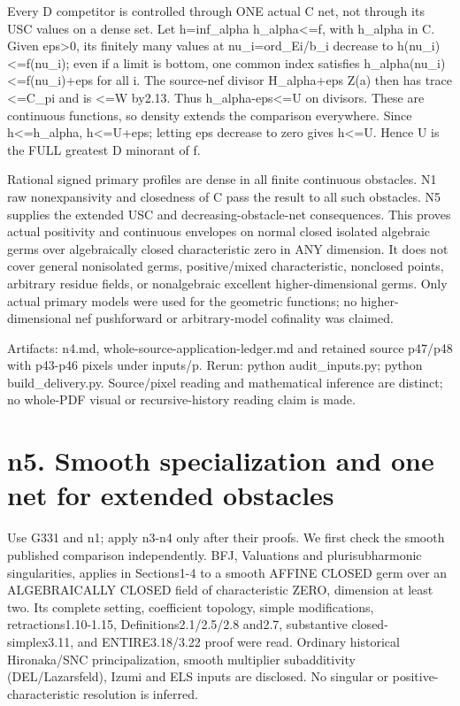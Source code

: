 \documentclass[11pt]{article}
\begin{document}
Every D competitor is controlled through ONE actual C net, not through its USC values on a dense set. Let h=inf\_alpha h\_alpha<=f, with h\_alpha in C. Given eps>0, its finitely many values at nu\_i=ord\_Ei/b\_i decrease to h(nu\_i)<=f(nu\_i); even if a limit is bottom, one common index satisfies h\_alpha(nu\_i)<=f(nu\_i)+eps for all i. The source-nef divisor H\_alpha+eps Z(a) then has trace <=C\_pi and is <=W by2.13. Thus h\_alpha-eps<=U on divisors. These are continuous functions, so density extends the comparison everywhere. Since h<=h\_alpha, h<=U+eps; letting eps decrease to zero gives h<=U. Hence U is the FULL greatest D minorant of f.

Rational signed primary profiles are dense in all finite continuous obstacles. N1 raw nonexpansivity and closedness of C pass the result to all such obstacles. N5 supplies the extended USC and decreasing-obstacle-net consequences. This proves actual positivity and continuous envelopes on normal closed isolated algebraic germs over algebraically closed characteristic zero in ANY dimension. It does not cover general nonisolated germs, positive/mixed characteristic, nonclosed points, arbitrary residue fields, or nonalgebraic excellent higher-dimensional germs. Only actual primary models were used for the geometric functions; no higher-dimensional nef pushforward or arbitrary-model cofinality was claimed.

Artifacts: n4.md, whole-source-application-ledger.md and retained source p47/p48 with p43-p46 pixels under inputs/p. Rerun: python audit\_inputs.py; python build\_delivery.py. Source/pixel reading and mathematical inference are distinct; no whole-PDF visual or recursive-history reading claim is made.


\section*{n5. Smooth specialization and one net for extended obstacles}

Use G331 and n1; apply n3-n4 only after their proofs. We first check the smooth published comparison independently. BFJ, Valuations and plurisubharmonic singularities, applies in Sections1-4 to a smooth AFFINE CLOSED germ over an ALGEBRAICALLY CLOSED field of characteristic ZERO, dimension at least two. Its complete setting, coefficient topology, simple modifications, retractions1.10-1.15, Definitions2.1/2.5/2.8 and2.7, substantive closed-simplex3.11, and ENTIRE3.18/3.22 proof were read. Ordinary historical Hironaka/SNC principalization, smooth multiplier subadditivity (DEL/Lazarsfeld), Izumi and ELS inputs are disclosed. No singular or positive-characteristic resolution is inferred.
\end{document}
